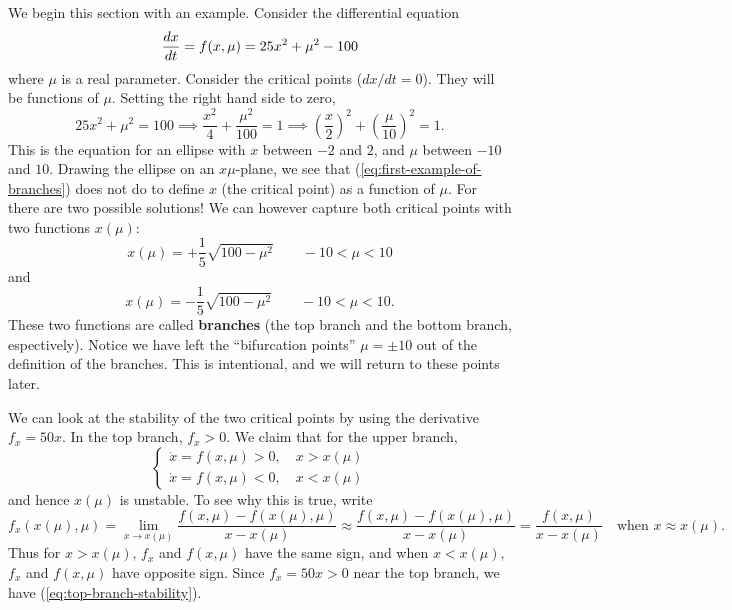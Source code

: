 \documentclass[11pt, letterpaper, oneside]{article}     %
\numberwithin{equation}{subsection}
\theoremstyle{definition}
\numberwithin{theorem}{section}
\theoremstyle{remark}
\begin{document}
We begin this section with an example. Consider the differential equation
\begin{equation}
  \frac{dx}{dt} = f(x,\mu)\\
  = 25x^2 + \mu^2 - 100
\end{equation}
where $\mu$ is a real parameter. Consider the critical points ($dx/dt = 0$). They will be functions of $\mu$. Setting the right hand side to zero,
\begin{equation}\label{eq:first-example-of-branches}
  25x^2 + \mu^2 = 100
  \implies \frac{x^2}{4} + \frac{\mu^2}{100} = 1
  \implies \left(\frac{x}{2}\right)^2 + \left(\frac{\mu}{10}\right)^2 = 1.
\end{equation}
This is the equation for an ellipse with $x$ between $-2$ and $2$, and $\mu$ between $-10$ and $10$. Drawing the ellipse on an $x\mu$-plane, we see that (\ref{eq:first-example-of-branches}) does not do to define $x$ (the critical point) as a function of $\mu$. For there are two possible solutions! We can however capture both critical points with two functions $x(\mu)$:
\begin{equation}
  x(\mu) = +\frac{1}{5}\sqrt{100 - \mu^2}\quad\quad -10 < \mu < 10
\end{equation}
and
\begin{equation}
  x(\mu) = -\frac{1}{5}\sqrt{100 - \mu^2}\quad\quad -10 < \mu < 10.
\end{equation}
These two functions are called \textbf{branches} (the top branch and the bottom branch, espectively). Notice we have left the ``bifurcation points'' $\mu = \pm10$ out of the definition of the branches. This is intentional, and we will return to these points later.

We can look at the stability of the two critical points by using the derivative $f_x = 50x$. In the top branch, $f_x > 0$. We claim that for the upper branch,
\begin{equation}\label{eq:top-branch-stability}
  \begin{cases}
    \dot x = f(x,\mu) > 0,\quad x > x(\mu)\\
    \dot x = f(x,\mu) < 0,\quad x < x(\mu)
  \end{cases}
\end{equation}
and hence $x(\mu)$ is unstable. To see why this is true, write
\begin{equation}
  f_x(x(\mu),\mu) = \lim_{x\to x(\mu)}\frac{f(x,\mu)-f(x(\mu),\mu)}{x-x(\mu)}
  \approx \frac{f(x,\mu)-f(x(\mu),\mu)}{x-x(\mu)} = \frac{f(x,\mu)}{x-x(\mu)}\quad
  \text{when $x\approx x(\mu)$}.
\end{equation}
Thus for $x>x(\mu)$, $f_x$ and $f(x,\mu)$ have the same sign, and when $x < x(\mu)$, $f_x$ and $f(x,\mu)$ have opposite sign. Since $f_x = 50x > 0$ near the top branch, we have (\ref{eq:top-branch-stability}).
\end{document}
